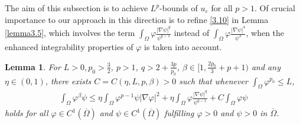 \documentclass[12pt]{article}
\theoremstyle{plain}
\newtheorem{lemma}{Lemma}[section]
\theoremstyle{definition}
\numberwithin{equation}{section}
\begin{document}
The aim of this subsection is to achieve  $L^p$-bounds of $u_{\varepsilon}$ for all $p> 1$.  Of crucial importance to our approach in this direction is to refine \eqref{3.10} in Lemma \ref{lemma3.5}, which involves the term $\int_{\Omega}\varphi\frac{|\nabla
    \psi|^q}{\psi^{q-1}}$ instead of $\int_{\Omega}\varphi\frac{|\nabla
    \psi|^4}{\psi^{3}}$,  when the enhanced integrability properties of  $\varphi$ is taken into account.
\begin{lemma}\label{lemma3.7}
For $L>0,p_0>\frac{3}{2}$, $p>1$, $q>2+\frac{3p}{p_0}$, $\beta\in [1,\frac{2p_0}{3}+p+1)$
and any $\eta\in(0,1)$, there exists $C=C(\eta, L,p,\beta
 )>0$ such that
whenever  $\int_{\Omega}\varphi^{p_0}\leq L$,
  \begin{align}\label{3.25}
    \int_{\Omega}\varphi^{\beta} \psi\leq \eta \int_{\Omega}\varphi^{p-1}\psi|\nabla
    \varphi|^2+\eta \int_{\Omega}\varphi\frac{|\nabla  \psi|^q}{{\psi}^{q-1}}+C\int_{\Omega}\varphi \psi
\end{align} holds for   all $\varphi\in C^1(\overline \Omega)$ and $\psi \in C^1(\overline \Omega)$ fulfilling $\varphi> 0$ and $\psi>0$ in $\overline \Omega$.
\end{lemma}
\end{document}
